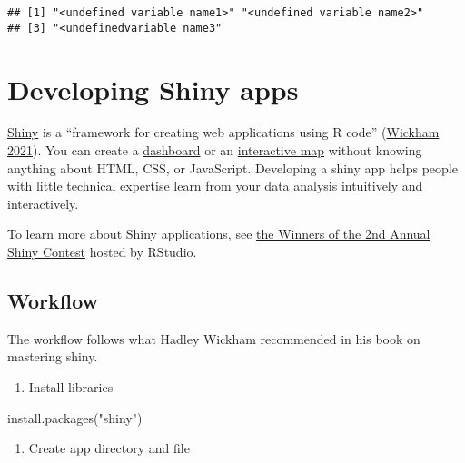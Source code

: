 \documentclass[
]{book}
\newenvironment{Shaded}{\begin{snugshade}}{\end{snugshade}}
\newcommand{\FunctionTok}[1]{\textcolor[rgb]{0.00,0.00,0.00}{#1}}
\newcommand{\NormalTok}[1]{#1}
\newcommand{\StringTok}[1]{\textcolor[rgb]{0.31,0.60,0.02}{#1}}
\providecommand{\tightlist}{%
  \setlength{\itemsep}{0pt}\setlength{\parskip}{0pt}}
\begin{document}
\begin{verbatim}
## [1] "<undefined variable name1>" "<undefined variable name2>"
## [3] "<undefinedvariable name3"
\end{verbatim}

\hypertarget{developing-shiny-apps}{%
\section{Developing Shiny apps}\label{developing-shiny-apps}}

\href{https://shiny.rstudio.com/}{Shiny} is a ``framework for creating web applications using R code'' (\href{https://mastering-shiny.org/}{Wickham 2021}). You can create a \href{https://rstudio.github.io/shinydashboard/}{dashboard} or an \href{https://rviews.rstudio.com/2019/10/09/building-interactive-world-maps-in-shiny/}{interactive map} without knowing anything about HTML, CSS, or JavaScript. Developing a shiny app helps people with little technical expertise learn from your data analysis intuitively and interactively.

To learn more about Shiny applications, see \href{https://blog.rstudio.com/2020/07/13/winners-of-the-2nd-shiny-contest/}{the Winners of the 2nd Annual Shiny Contest} hosted by RStudio.

\hypertarget{workflow-1}{%
\subsection{Workflow}\label{workflow-1}}

The workflow follows what Hadley Wickham recommended in his book on mastering shiny.

\begin{enumerate}
\def\labelenumi{\arabic{enumi}.}
\tightlist
\item
  Install libraries
\end{enumerate}

\begin{Shaded}
\begin{Highlighting}[]
\FunctionTok{install.packages}\NormalTok{(}\StringTok{"shiny"}\NormalTok{)}
\end{Highlighting}
\end{Shaded}

\begin{enumerate}
\def\labelenumi{\arabic{enumi}.}
\setcounter{enumi}{1}
\tightlist
\item
  Create app directory and file
\end{enumerate}
\end{document}
